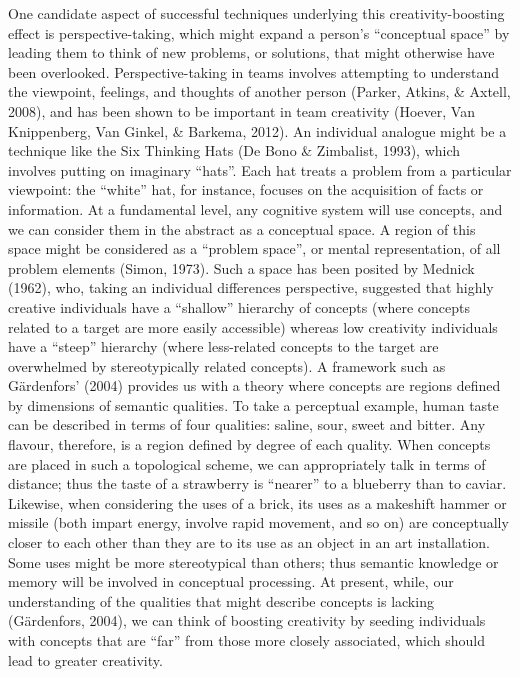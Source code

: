 \documentclass[english,man]{apa6}
\begin{document}
One candidate aspect of successful techniques underlying this
creativity-boosting effect is perspective-taking, which might expand a
person's \enquote{conceptual space} by leading them to think of new
problems, or solutions, that might otherwise have been overlooked.
Perspective-taking in teams involves attempting to understand the
viewpoint, feelings, and thoughts of another person (Parker, Atkins, \&
Axtell, 2008), and has been shown to be important in team creativity
(Hoever, Van Knippenberg, Van Ginkel, \& Barkema, 2012). An individual
analogue might be a technique like the Six Thinking Hats (De Bono \&
Zimbalist, 1993), which involves putting on imaginary \enquote{hats}.
Each hat treats a problem from a particular viewpoint: the
\enquote{white} hat, for instance, focuses on the acquisition of facts
or information. At a fundamental level, any cognitive system will use
concepts, and we can consider them in the abstract as a conceptual
space. A region of this space might be considered as a \enquote{problem
space}, or mental representation, of all problem elements (Simon, 1973).
Such a space has been posited by Mednick (1962), who, taking an
individual differences perspective, suggested that highly creative
individuals have a \enquote{shallow} hierarchy of concepts (where
concepts related to a target are more easily accessible) whereas low
creativity individuals have a \enquote{steep} hierarchy (where
less-related concepts to the target are overwhelmed by stereotypically
related concepts). A framework such as Gärdenfors' (2004) provides us
with a theory where concepts are regions defined by dimensions of
semantic qualities. To take a perceptual example, human taste can be
described in terms of four qualities: saline, sour, sweet and bitter.
Any flavour, therefore, is a region defined by degree of each quality.
When concepts are placed in such a topological scheme, we can
appropriately talk in terms of distance; thus the taste of a strawberry
is \enquote{nearer} to a blueberry than to caviar. Likewise, when
considering the uses of a brick, its uses as a makeshift hammer or
missile (both impart energy, involve rapid movement, and so on) are
conceptually closer to each other than they are to its use as an object
in an art installation. Some uses might be more stereotypical than
others; thus semantic knowledge or memory will be involved in conceptual
processing. At present, while, our understanding of the qualities that
might describe concepts is lacking (Gärdenfors, 2004), we can think of
boosting creativity by seeding individuals with concepts that are
\enquote{far} from those more closely associated, which should lead to
greater creativity.
\end{document}
